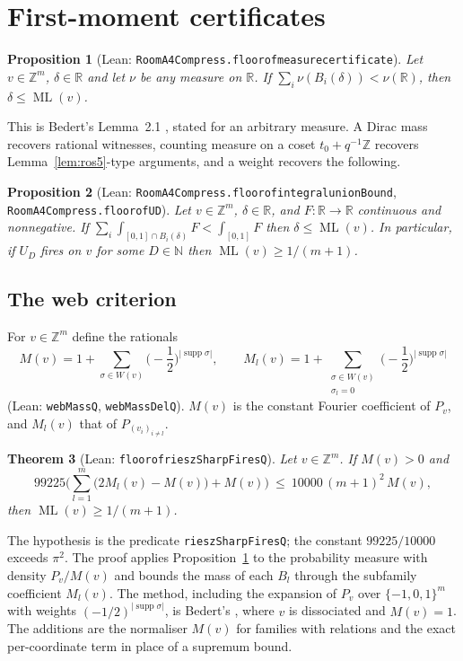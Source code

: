 \documentclass[11pt]{amsart}
\theoremstyle{plain}
\newtheorem{theorem}{Theorem}[section]
\newtheorem{proposition}[theorem]{Proposition}
\theoremstyle{definition}
\theoremstyle{remark}
\newcommand{\ML}{\operatorname{ML}}
\newcommand{\Z}{\mathbb{Z}}
\newcommand{\R}{\mathbb{R}}
\newcommand{\N}{\mathbb{N}}
\newcommand{\lean}[1]{{\def\_{\textunderscore\allowbreak}\def\.{.\allowbreak}\texttt{#1}}}
\begin{document}
\section{First-moment certificates}\label{sec:moment}

\begin{proposition}[Lean: \lean{RoomA4Compress\.floor\_of\_measure\_certificate}]\label{prop:measure}
Let $v\in\Z^m$, $\delta\in\R$ and let $\nu$ be any measure on $\R$. If
$\sum_i\nu(B_i(\delta))<\nu(\R)$, then $\delta\le\ML(v)$.
\end{proposition}

This is Bedert's Lemma~2.1 \cite{bedert}, stated for an arbitrary measure. A Dirac mass recovers
rational witnesses, counting measure on a coset $t_0+q^{-1}\Z$ recovers Lemma~\ref{lem:ros5}-type
arguments, and a weight recovers the following.

\begin{proposition}[Lean: \lean{RoomA4Compress\.floor\_of\_integral\_unionBound}, \lean{RoomA4Compress\.floor\_of\_UD}]\label{prop:UD}
Let $v\in\Z^m$, $\delta\in\R$, and $F:\R\to\R$ continuous and nonnegative. If
$\sum_i\int_{[0,1]\cap B_i(\delta)}F<\int_{[0,1]}F$ then $\delta\le\ML(v)$. In particular, if $U_D$
fires on $v$ for some $D\in\N$ then $\ML(v)\ge1/(m+1)$.
\end{proposition}

\subsection{The web criterion}
For $v\in\Z^m$ define the rationals
\[
  M(v)=1+\sum_{\sigma\in W(v)}\Big(-\frac12\Big)^{|\operatorname{supp}\sigma|},\qquad
  M_l(v)=1+\sum_{\substack{\sigma\in W(v)\\ \sigma_l=0}}\Big(-\frac12\Big)^{|\operatorname{supp}\sigma|}
\]
(Lean: \lean{webMassQ}, \lean{webMassDelQ}). $M(v)$ is the constant Fourier coefficient of $P_v$,
and $M_l(v)$ that of $P_{(v_i)_{i\ne l}}$.

\begin{theorem}[Lean: \lean{floor\_of\_rieszSharpFiresQ}]\label{thm:webriesz}
Let $v\in\Z^m$. If $M(v)>0$ and
\[
  99225\Big(\sum_{l=1}^m\big(2M_l(v)-M(v)\big)+M(v)\Big)\ \le\ 10000\,(m+1)^2\,M(v),
\]
then $\ML(v)\ge1/(m+1)$.
\end{theorem}

The hypothesis is the predicate \lean{rieszSharpFiresQ}; the constant $99225/10000$ exceeds
$\pi^2$. The proof applies Proposition~\ref{prop:measure} to the probability measure with density
$P_v/M(v)$ and bounds the mass of each $B_l$ through the subfamily coefficient $M_l(v)$. The
method, including the expansion of $P_v$ over $\{-1,0,1\}^m$ with weights
$(-1/2)^{|\operatorname{supp}\sigma|}$, is Bedert's \cite[Lemma~4.1]{bedert}, where $v$ is
dissociated and $M(v)=1$. The additions are the normaliser $M(v)$ for families with relations and
the exact per-coordinate term in place of a supremum bound.
\end{document}
